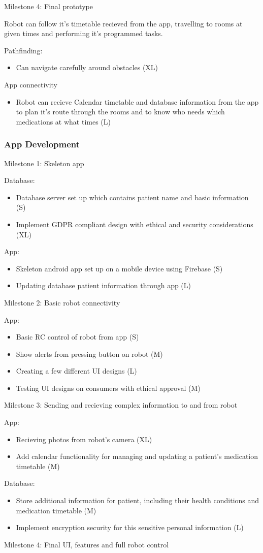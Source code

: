 \documentclass{article}
\begin{document}
Milestone 4: Final prototype

Robot can follow it's timetable recieved from the app, travelling to rooms at given times and performing it's programmed tasks.

Pathfinding:
\begin{itemize}
\item Can navigate carefully around obstacles (XL)
\end{itemize}
App connectivity 
\begin{itemize}
\item Robot can recieve Calendar timetable and database information from the app to plan it's route through the rooms and to know who         needs which medications at what times (L)
\end{itemize}
    
\subsubsection{App Development}

Milestone 1: Skeleton app

Database:
\begin{itemize}
\item Database server set up which contains patient name and basic information (S)
\item Implement GDPR compliant design with ethical and security considerations  (XL)
\end{itemize}
    
App:
\begin{itemize}
\item Skeleton android app set up on a mobile device using Firebase (S)
\item Updating database patient information through app (L)
\end{itemize}    
Milestone 2: Basic robot connectivity

App:
\begin{itemize}
\item Basic RC control of robot from app (S)
\item Show alerts from pressing button on robot (M)
\item Creating a few different UI designs (L)
\item Testing UI designs on consumers with ethical approval (M)
\end{itemize}
Milestone 3: Sending and recieving complex information to and from robot

App:
\begin{itemize}
\item Recieving photos from robot's camera (XL)
\item Add calendar functionality for managing and updating a patient's medication timetable (M)
\end{itemize}
Database:
\begin{itemize}
\item Store additional information for patient, including their health conditions and medication timetable (M)
\item Implement encryption security for this sensitive personal information (L)
\end{itemize}
Milestone 4: Final UI, features and full robot control
\end{document}
